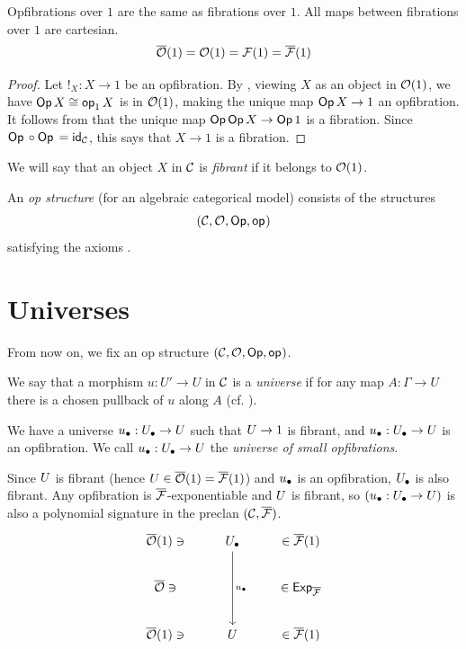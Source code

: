 \begin{proposition}
  Opfibrations over $1$ are the same as fibrations over $1$.
  All maps between fibrations over $1$ are cartesian.
  \[ \opfib(1) = \opfibcart(1) = \fibcart(1) = \fib(1) \]
\end{proposition}
\begin{proof}
  Let $!_X : X \to 1$ be an opfibration.
  By , viewing $X$ as an object in $\opfibcart(1)$,
  we have $\Op{X} \iso \vOp[1]{X}$ is in $\opfibcart(1)$,
  making the unique map $\Op{X} \to 1$ an opfibration.
  It follows from  that the unique map
  $\Op{\Op{X}} \to \Op{1}$ is a fibration.
  Since $\Op{} \circ \Op{} = \id_\CC$,
  this says that $X \to 1$ is a fibration.
\end{proof}

We will say that an object $X$ in $\CC$ is \emph{fibrant} if it belongs
to $\opfibcart(1)$.

\begin{definition}\label{def:ACM}
  An \emph{op structure} (for an algebraic categorical model) consists of the structures
  \[(\CC,\opfibcart,\Op,\vOp)\]
  satisfying the axioms
  .
\end{definition}

\section*{Universes}
From now on, we fix an op structure $(\CC,\opfibcart,\Op,\vOp)$.
\begin{definition}
We say that a morphism $u : U' \to U$ in $\CC$
is a \emph{universe} if for any map $A : \Gamma \to U$
there is a chosen pullback of $u$ along $A$
(cf. ).
\end{definition}

\begin{axiom}\label{ax:universe}
  We have a universe $\ulow : \Ulow \to \U$
  such that $\U \to 1$ is fibrant,
  and $\ulow : \Ulow \to \U$ is an opfibration.
  We call $\ulow : \Ulow \to \U$ the \emph{universe of small opfibrations}.
\end{axiom}

Since $\U$ is fibrant (hence $\U \in \opfib(1) = \fib(1)$) and $\ulow$ is an opfibration,
$\Ulow$ is also fibrant.
Any opfibration is $\fib$-exponentiable
and $\U$ is fibrant,
so $(\ulow : \Ulow \to \U)$ is also a polynomial signature in the preclan
$(\CC, \fib)$.
\[
\begin{tikzcd}
	{\opfib(1) \ni} & \Ulow & \in \fib(1) \\
	{\opfib \ni} && {\in \Exp_\fib} \\
	{\opfib(1) \ni} & \U & {\in \fib(1)}
	\arrow["\ulow", from=1-2, to=3-2]
\end{tikzcd}
\]

